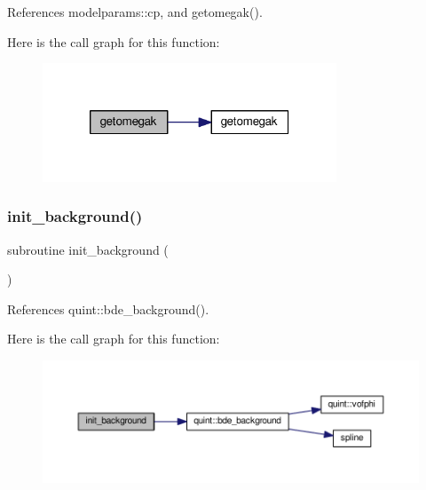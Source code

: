 References modelparams\+::cp, and getomegak().

Here is the call graph for this function\+:
\nopagebreak
\begin{figure}[H]
\begin{center}
\leavevmode
\includegraphics[width=248pt]{equations__bde__v3_8f90_a2c95a3b42a68aa87a21097ce3ff8bbe6_cgraph}
\end{center}
\end{figure}
\mbox{\label{equations__bde__v3_8f90_a47540f6082acc64c78a1daac45637fd6}} 
\subsubsection{\texorpdfstring{init\+\_\+background()}{init\_background()}}
{\footnotesize\ttfamily subroutine init\+\_\+background (\begin{DoxyParamCaption}{ }\end{DoxyParamCaption})}



References quint\+::bde\+\_\+background().

Here is the call graph for this function\+:
\nopagebreak
\begin{figure}[H]
\begin{center}
\leavevmode
\includegraphics[width=350pt]{equations__bde__v3_8f90_a47540f6082acc64c78a1daac45637fd6_cgraph}
\end{center}
\end{figure}
